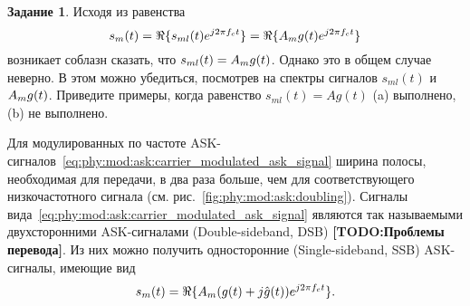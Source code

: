 \documentclass{book}
\numberwithin{theorem}{chapter}
\numberwithin{statement}{chapter}
\numberwithin{lemma}{chapter}
\theoremstyle{definition}
\newtheorem{task}{Задание}
\numberwithin{task}{chapter}
\theoremstyle{remark}
\numberwithin{example}{chapter}
\theoremstyle{definition}
\numberwithin{definition}{chapter}
\theoremstyle{remark}
\theoremstyle{remark}
\numberwithin{lyrics}{section}
\newcommand{\TODO}[1]{\textbf{[TODO:#1]}}
\begin{document}
\begin{task}
	\label{task:phy:mod:ask:task1}
	Исходя из равенства
	\begin{equation*}
	s_m(t) = \Re\{s_{ml}(t)e^{j2\pi f_c t}\} = \Re\{A_m g(t) e^{j2\pi f_c t}\}
	\end{equation*}
	возникает соблазн сказать, что $s_{ml}(t) = A_m g(t)$. Однако это в общем случае неверно. В этом можно убедиться, посмотрев на спектры сигналов $s_{ml}(t)$ и $A_m g(t)$. Приведите примеры, когда равенство $s_{ml}(t) = A g(t)$ (a) выполнено, (b) не выполнено.
\end{task}

Для модулированных по частоте ASK-сигналов~\eqref{eq:phy:mod:ask:carrier_modulated_ask_signal} ширина полосы, необходимая для передачи, в два раза больше, чем для соответствующего низкочастотного сигнала (см. рис.~\ref{fig:phy:mod:ask:doubling}). Сигналы вида~\eqref{eq:phy:mod:ask:carrier_modulated_ask_signal} являются так называемыми двухсторонними ASK-сигналами (Double-sideband, DSB) \TODO{Проблемы перевода}. Из них можно получить односторонние (Single-sideband, SSB) ASK-сигналы, имеющие вид
\begin{equation}
\notag
s_m(t) = \Re\{A_m (g(t) + j \hat{g}(t)) e^{j2\pi f_c t}\}.
\end{equation}
\end{document}
